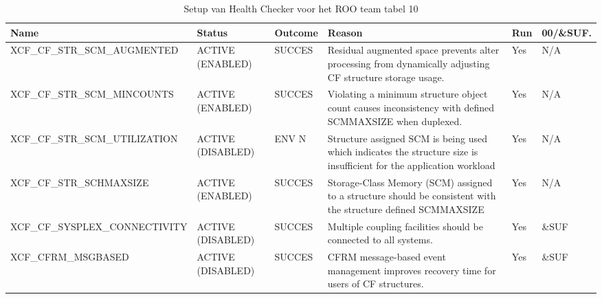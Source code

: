 \begin{landscape}
	\begin{table}[h]
		\begin{tabular}{|l|p{2.3cm}|l|p{4.5cm}|l|l|}
			\hline
			\textbf{Name}                       & \textbf{Status}   & \textbf{Outcome} & \textbf{Reason}    & \textbf{Run} &	\textbf{00/\&SUF.} \\ \hline
			XCF\_CF\_STR\_SCM\_AUGMENTED   & ACTIVE (ENABLED)  & SUCCES & Residual   augmented space prevents alter processing from dynamically adjusting    CF   structure storage usage.         & Yes & N/A   \\ \hline
			XCF\_CF\_STR\_SCM\_MINCOUNTS   & ACTIVE (ENABLED)  & SUCCES & Violating   a minimum structure object count causes inconsistency with defined   SCMMAXSIZE   when duplexed.             & Yes & N/A   \\ \hline
			XCF\_CF\_STR\_SCM\_UTILIZATION & ACTIVE (DISABLED) & ENV N  & Structure assigned SCM is being used which indicates the structure   size is   insufficient for the application workload & Yes & N/A   \\ \hline
			XCF\_CF\_STR\_SCHMAXSIZE       & ACTIVE (ENABLED)  & SUCCES & Storage-Class Memory (SCM) assigned to a structure should be   consistent with    the structure defined SCMMAXSIZE       & Yes & N/A   \\ \hline
			XCF\_CF\_SYSPLEX\_CONNECTIVITY & ACTIVE (DISABLED) & SUCCES & Multiple   coupling facilities should be connected to all systems.                                                       & Yes & \&SUF \\ \hline
			XCF\_CFRM\_MSGBASED            & ACTIVE (DISABLED) & SUCCES & CFRM   message-based event management improves recovery time for    users   of CF structures.                            & Yes & \&SUF \\ \hline
		\end{tabular}
		\caption[Health Checker ROO team tabel 10]{Setup van Health Checker voor het ROO team tabel 10}
		\label{tbl:ROO Team Tabel 10}
	\end{table}
\end{landscape}


